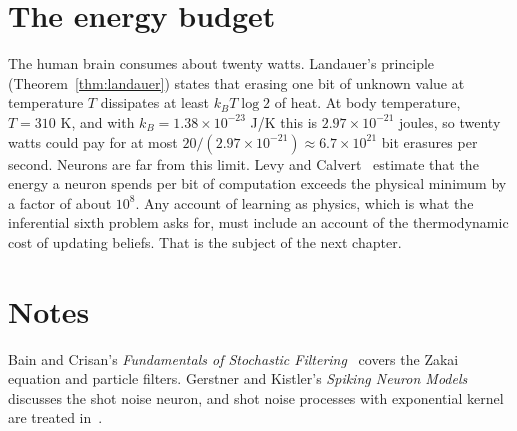 \section{The energy budget}

The human brain consumes about twenty watts. Landauer's principle (Theorem~\ref{thm:landauer}) states that erasing one bit of unknown value at temperature $T$ dissipates at least $k_BT\log2$ of heat. At body temperature, $T = 310$ K, and with $k_B = 1.38\times10^{-23}$ J/K this is $2.97\times10^{-21}$ joules, so twenty watts could pay for at most $20/(2.97\times10^{-21})\approx6.7\times10^{21}$ bit erasures per second. Neurons are far from this limit. Levy and Calvert~\cite{levycalvert2021} estimate that the energy a neuron spends per bit of computation exceeds the physical minimum by a factor of about $10^8$. Any account of learning as physics, which is what the inferential sixth problem asks for, must include an account of the thermodynamic cost of updating beliefs. That is the subject of the next chapter.



\section*{Notes}

Bain and Crisan's \emph{Fundamentals of Stochastic Filtering}~\cite{bain2009} covers the Zakai equation and particle filters. Gerstner and Kistler's \emph{Spiking Neuron Models}~\cite{gerstner2002} discusses the shot noise neuron, and shot noise processes with exponential kernel are treated in~\cite{polsonsokolov2026gbcshot}.
